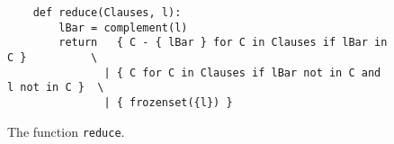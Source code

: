 \begin{figure}[!ht]
  \centering
\begin{verbatim}
    def reduce(Clauses, l):
        lBar = complement(l)
        return   { C - { lBar } for C in Clauses if lBar in C }          \
               | { C for C in Clauses if lBar not in C and l not in C }  \
               | { frozenset({l}) }
\end{verbatim}
\vspace*{-0.3cm}
  \caption{The function \texttt{reduce}. }
  \label{fig:reduce}
\end{figure} 


